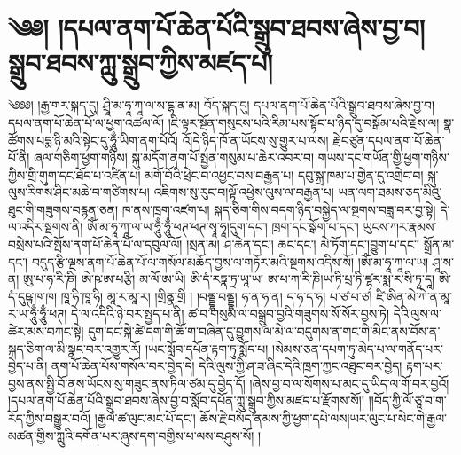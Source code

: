 \chapter{༄༅། །དཔལ་ནག་པོ་ཆེན་པོའི་སྒྲུབ་ཐབས་ཞེས་བྱ་བ། སྒྲུབ་ཐབས་ཀླུ་སྒྲུབ་ཀྱིས་མཛད་པ།}༄༅༅། །རྒྱ་གར་སྐད་དུ། ཤྲཱི་མ་ཧཱ་ཀཱ་ལ་ས་དྷ་ན་མ། བོད་སྐད་དུ། དཔལ་ནག་པོ་ཆེན་པོའི་སྒྲུབ་ཐབས་ཞེས་བྱ་བ། དཔལ་ནག་པོ་ཆེན་པོ་ལ་ཕྱག་འཚལ་ལོ། །ཇི་ལྟར་སྔོན་གསུངས་པའི་རིམ་པས་སྟོང་པ་ཉིད་དུ་བསྒོམ་པའི་རྗེས་ལ། སྣ་ཚོགས་པདྨ་ཉི་མའི་སྟེང་དུ་ཧཱུྃ་ཡིག་ནག་པོའོ། འོ།དེ་ཉིད་ཁོ་ན་ཡོངས་སུ་གྱུར་པ་ལས། རྗེ་བཙུན་དཔལ་ནག་པོ་ཆེན་པོ་ནི། ཞལ་གཅིག་ཕྱག་གཉིས། སྐུ་མདོག་ནག་པོ་སྤྱན་གསུམ་པ་ཆེར་འབར་བ། གཡས་དང་གཡོན་གྱི་ཕྱག་གཉིས་ཀྱིས་གྲི་གུག་དང་ཐོད་པ་འཛིན་པ། མགོ་བོའི་ཕྲེང་བ་འཕྱང་བས་བརྒྱན་པ། དབུ་སྐྲ་ཁམ་པ་གྱེན་དུ་འགྲེང་བ། སྐུ་ལུས་རིགས་ཤིང་མཆེ་བ་གཙིགས་པ། འཇིགས་སུ་རུང་བ།ལྟོ་འཕྱེས་ལུས་ལ་བརྒྱན་པ། ཡན་ལག་ཐམས་ཅད་མིའུ་ཐུང་གི་གཟུགས་བརྙན་ཅན། ཁ་ནས་ཁྲག་འཛག་པ། སྐད་ཅིག་གིས་བདག་ཉིད་བསྐྱེད་ལ་སྔགས་བཟླ་བར་བྱ་སྟེ། དེ་ལ་འདིར་སྔགས་ནི། ཨོཾ་མ་ཧཱ་ཀཱ་ལ་ཡ་ཧཱུྃ་ཧཱུྃ་ཕཊ་ཕཊ་སྭཱ་ཧཱ།དུག་དང་། ཁྲག་དང་སྒོག་པ་དང་། ཡུངས་ཀར་རྣམས་བསྲེས་པའི་སྤོས་ནག་པོ་ཆེན་པོ་ལ་དབུལ་ལོ། །སྲན་མ། ཤ་ཆེན་དང་། ཆང་དང་། མེ་ཏོག་དང་།བྱུག་པ་དང་། སྒྲོན་མ་དང་། བདུད་རྩི་ལྔས་ནག་པོ་ཆེན་པོ་ལ་གསོལ་མཆོད་བྱས་ལ་གཏོར་མའི་སྔགས་འདིས་སོ། །ཨོཾ་མ་ཧཱ་ཀཱ་ལ་ཡ། ཤཱ་ས་ན། ཨུ་པ་ཧ་རི་ཎི། ཨེ་ཥ་ཨ་པརྩི། མ་ལོ་ཨ་ཡི། ཨི་དཾ་རཏྣ་ཏྲ་ཡཱ་ཡ། ཨ་པ་ཀ་རི་ཎི།ཡ་ཏི་པྲ་ཏི་ཛྷར་སྨ་ར་སི་ཏཱ་དཱ། ཨི་དཾ་དུཥྚ་ཁ་ཁ། ཁཱ་ཧི་ཁཱ་ཧི། མཱ་ར་མཱ་ར། །གྲིནྣ་གྲི ། །བནྡྷ་བནྡྷ། ཧ་ན་ཧ་ན། ད་ཧ་ད་ཧ། པ་ཙ་པ་ཙ། ཛི་ཨིན་མེ་ཀེ་ན་མཱ་ར་ཡ་ཧཱུྃ་ཧཱུྃ་ཕཊ། དེ་ལ་འདིའི་ཉེ་བར་སྤྱད་པ་ནི། ཚ་བ་གསུམ་ལ་བསྒྲུབ་བྱའི་གཟུགས་སོ་སོར་བྱས་ཏེ། དེའི་ལུས་ལ་ཚེར་མས་བཀང་སྟེ། དུག་དང་སྐེ་ཚེ་དག་གི་ཆོ་ག་བཞིན་དུ་བྱུགས་ལ་མེ་ལ་བདུགས་ན་གང་གི་མིང་ནས་བོས་ན་སྐད་ཅིག་ལ་མི་སྣང་བར་འགྱུར་རོ། །ཡང་སློབ་དཔོན་རྟག་ཏུ་སྨོད་པ། །སེམས་ཅན་དཔག་ཏུ་མེད་པ་ལ་གནོད་པར་བྱེད་པ་ནི། ནག་པོ་ཆེན་པོས་གསོལ་བར་བྱེད་དེ། དེའི་ལུས་ཀྱི་ཤ་ཟ་ཞིང་དེའི་ཁྲག་ཀྱང་འཐུང་བར་བྱེད། རྟག་པར་བྱས་ནས་སྤྱི་བོ་ནས་ཡོངས་སུ་གཟུང་ནས་ཏིལ་ཙམ་དུ་བྱེད་དོ། །ཞེས་བྱ་བ་ལ་སོགས་པ་མང་དུ་ཡིད་ལ་གོ་བར་བྱའོ། །དཔལ་ནག་པོ་ཆེན་པོའི་སྒྲུབ་ཐབས་ཞེས་བྱ་བ་སློབ་དཔོན་ཀླུ་སྒྲུབ་ཀྱིས་མཛད་པ་རྫོགས་སོ།། །།བོད་ཀྱི་ལོ་ཙཱ་བ་ག་རོད་ཀྱིས་བསྒྱུར་བའོ། །རྒྱལ་ཚ་ལུང་མང་པོ་དང་། ཆོས་རྗེ་བསོད་ནམས་ཀྱི་ཕྱག་དཔེ་ལས།ཡར་ལུང་པ་སེང་གེ་རྒྱལ་མཚན་གྱིས་ཀླུའི་དགོན་པར་ཞུས་དག་བགྱིས་པ་ལས་བཤུས་སོ། །